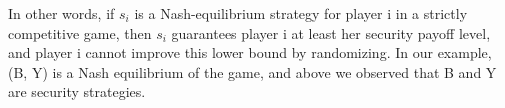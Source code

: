 In other words, if $s_i$ is a Nash-equilibrium strategy for player i in a strictly competitive game, then $s_i$ guarantees player i at least her security payoff level, and player i cannot improve this lower bound by randomizing. In our example, (B, Y) is a Nash equilibrium of the game, and above we observed that B and Y are security strategies.



